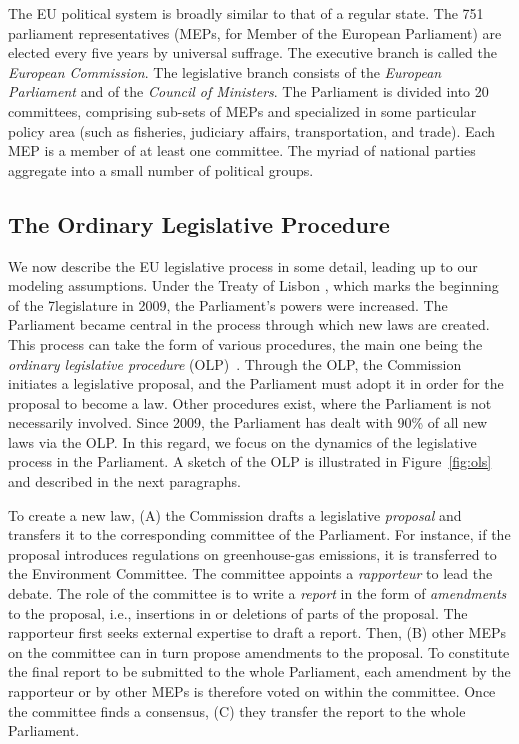 The EU political system is broadly similar to that of a regular state.
The 751 parliament representatives (MEPs, for Member of the European Parliament) are elected every five years by universal suffrage.
The executive branch is called the \textit{European Commission}.
The legislative branch consists of the \textit{European Parliament} and of the \textit{Council of Ministers}.
The Parliament is divided into 20 committees, comprising sub-sets of MEPs and specialized in some particular policy area (such as fisheries, judiciary affairs, transportation, and trade).
Each MEP is a member of at least one committee.
The myriad of national parties aggregate into a small number of political groups.

\subsection{The Ordinary Legislative Procedure}

We now describe the EU legislative process in some detail, leading up to our modeling assumptions.
Under the Treaty of Lisbon \cite{eu2007lisbon}, which marks the beginning of the 7\th legislature in 2009, the Parliament's powers were increased.
The Parliament became central in the process through which new laws are created.
This process can take the form of various procedures, the main one being the \textit{ordinary legislative procedure} (OLP)~\cite{europarl2018ordinary}.
Through the OLP, the Commission initiates a legislative proposal, and the Parliament must adopt it in order for the proposal to become a law.
Other procedures exist, where the Parliament is not necessarily involved.
Since 2009, the Parliament has dealt with 90\% of all new laws via the OLP.
In this regard, we focus on the dynamics of the legislative process in the Parliament.
A sketch of the OLP is illustrated in Figure~\ref{fig:ols} and described in the next paragraphs.

To create a new law, (A) the Commission drafts a legislative \textit{proposal} and transfers it to the corresponding committee of the Parliament.
For instance, if the proposal introduces regulations on greenhouse-gas emissions, it is transferred to the Environment Committee.
The committee appoints a \textit{rapporteur} to lead the debate.
The role of the committee is to write a \textit{report} in the form of \textit{amendments} to the proposal, i.e., insertions in or deletions of parts of the proposal.
The rapporteur first seeks external expertise to draft a report.
Then, (B) other MEPs on the committee can in turn propose amendments to the proposal.
To constitute the final report to be submitted to the whole Parliament, each amendment by the rapporteur or by other MEPs is therefore voted on within the committee.
Once the committee finds a consensus, (C) they transfer the report to the whole Parliament.

